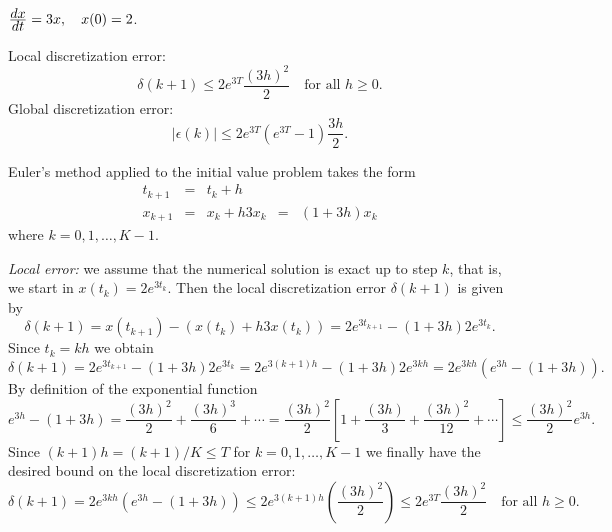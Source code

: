 \documentclass{ximera}
\begin{document}
\begin{exercise} \label{c15.2.1c}
$\frac{\displaystyle dx}{\displaystyle dt} = 3x,\quad x(0)=2$.

\begin{solution}
\ans Local discretization error:
\[
\delta(k+1) \le
2e^{3T}\frac{(3h)^2}{2} \quad \mbox{for all $h\ge 0$.}
\]
Global discretization error:
\[
|\epsilon(k)| \le 2e^{3T}(e^{3T}-1)\frac{3h}{2}.
\]

\soln Euler's method applied to the initial value problem takes the form
\[
\begin{array}{rclcl}
t_{k+1} & = & t_k+h & & \\
x_{k+1} & = & x_k + h 3x_k & = & (1+3h)x_k
\end{array}
\]
where $k=0,1,\ldots,K-1$.

{\em Local error:} we assume that the
numerical solution is exact up to step $k$, that is,
we start in $x(t_k)=2e^{3t_k}$.  Then the local discretization error
$\delta(k+1)$ is given by
\[
\delta(k+1) = x(t_{k+1}) - (x(t_k) + h 3 x(t_k))=
2e^{3t_{k+1}} - (1+3h)2e^{3t_k}.
\]
Since $t_k = kh$ we obtain
\[
\delta(k+1) = 2e^{3t_{k+1}} - (1+3h)2e^{3t_k} =
2e^{3(k+1)h} - (1+3h)2e^{3kh} = 2e^{3kh}(e^{3h}-(1+3h)).
\]
By definition of the exponential function
\[
e^{3h}-(1+3h) = \frac{(3h)^2}{2}+\frac{(3h)^3}{6}+\cdots =
\frac{(3h)^2}{2}\left[ 1+\frac{(3h)}{3}+\frac{(3h)^2}{12}+\cdots\right]
\le \frac{(3h)^2}{2}e^{3h}.
\]
Since $(k+1)h=(k+1)/K\le T$ for $k=0,1,\ldots,K-1$ we finally have the
desired bound on the local discretization error:
\[
\delta(k+1) = 2e^{3kh}(e^{3h}-(1+3h)) \le
2e^{3(k+1)h}\left(\frac{(3h)^2}{2}\right)\le
2e^{3T}\frac{(3h)^2}{2} \quad \mbox{for all $h\ge 0$.}
\]


\end{solution}
\end{exercise}
\end{document}
